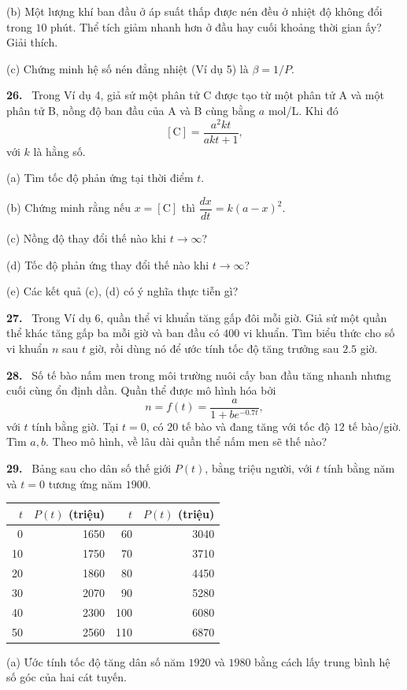 \documentclass[12pt,a4paper]{article}
\newcommand{\bt}[1]{\par\smallskip\noindent\textbf{#1.}\ }
\begin{document}
(b) Một lượng khí ban đầu ở áp suất thấp được nén đều ở nhiệt độ không đổi trong $10$ phút. Thể tích giảm nhanh hơn ở đầu hay cuối khoảng thời gian ấy? Giải thích.

(c) Chứng minh hệ số nén đẳng nhiệt (Ví dụ 5) là $\beta=1/P$.
\bt{26} Trong Ví dụ 4, giả sử một phân tử C được tạo từ một phân tử A và một phân tử B, nồng độ ban đầu của A và B cùng bằng $a$ mol/L. Khi đó
\[[\mathrm C]=\frac{a^2kt}{akt+1},\]
với $k$ là hằng số.

(a) Tìm tốc độ phản ứng tại thời điểm $t$.

(b) Chứng minh rằng nếu $x=[\mathrm C]$ thì $\dfrac{dx}{dt}=k(a-x)^2$.

(c) Nồng độ thay đổi thế nào khi $t\to\infty$?

(d) Tốc độ phản ứng thay đổi thế nào khi $t\to\infty$?

(e) Các kết quả (c), (d) có ý nghĩa thực tiễn gì?
\bt{27} Trong Ví dụ 6, quần thể vi khuẩn tăng gấp đôi mỗi giờ. Giả sử một quần thể khác tăng gấp ba mỗi giờ và ban đầu có $400$ vi khuẩn. Tìm biểu thức cho số vi khuẩn $n$ sau $t$ giờ, rồi dùng nó để ước tính tốc độ tăng trưởng sau $2.5$ giờ.
\par\medskip\noindent\begin{minipage}{\linewidth}
\bt{28} Số tế bào nấm men trong môi trường nuôi cấy ban đầu tăng nhanh nhưng cuối cùng ổn định dần. Quần thể được mô hình hóa bởi
\[n=f(t)=\frac a{1+be^{-0.7t}},\]
với $t$ tính bằng giờ. Tại $t=0$, có $20$ tế bào và đang tăng với tốc độ $12$ tế bào/giờ. Tìm $a,b$. Theo mô hình, về lâu dài quần thể nấm men sẽ thế nào?
\end{minipage}\par\medskip
\bt{29} Bảng sau cho dân số thế giới $P(t)$, bằng triệu người, với $t$ tính bằng năm và $t=0$ tương ứng năm $1900$.
\begin{center}\begin{tabular}{rrrr}\toprule
$t$ & $P(t)$ (triệu) & $t$ & $P(t)$ (triệu)\\\midrule
0&1650&60&3040\\10&1750&70&3710\\20&1860&80&4450\\30&2070&90&5280\\40&2300&100&6080\\50&2560&110&6870\\\bottomrule
\end{tabular}\end{center}
(a) Ước tính tốc độ tăng dân số năm $1920$ và $1980$ bằng cách lấy trung bình hệ số góc của hai cát tuyến.
\end{document}

